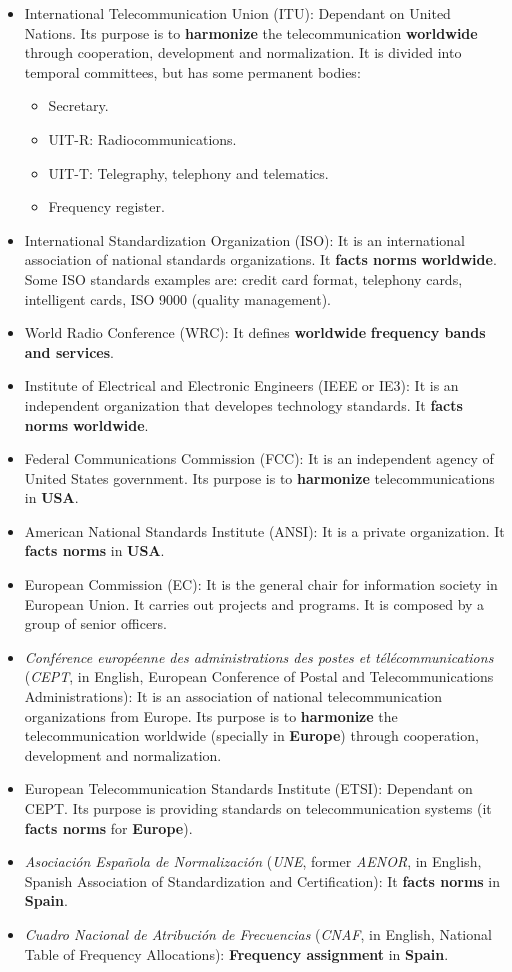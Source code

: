 \documentclass[../main.tex]{subfiles}
\begin{document}
\begin{itemize}
	\item {
		International Telecommunication Union (ITU): Dependant on United Nations. Its purpose is to \textbf{harmonize} the telecommunication \textbf{worldwide} through cooperation, development and normalization. It is divided into temporal committees, but has some permanent bodies:
		\begin{itemize}
			\item Secretary.
			\item UIT-R: Radiocommunications.
			\item UIT-T: Telegraphy, telephony and telematics.
			\item Frequency register.
		\end{itemize}
	}
	\item International Standardization Organization (ISO): It is an international association of national standards organizations. It \textbf{facts norms} \textbf{worldwide}. Some ISO standards examples are: credit card format, telephony cards, intelligent cards, ISO 9000 (quality management).
	\item World Radio Conference (WRC): It defines \textbf{worldwide} \textbf{frequency bands and services}.
	\item Institute of Electrical and Electronic Engineers (IEEE or IE3): It is an independent organization that developes technology standards. It \textbf{facts norms} \textbf{worldwide}.
	\item Federal Communications Commission (FCC): It is an independent agency of United States government. Its purpose is to \textbf{harmonize} telecommunications in \textbf{USA}.
	\item American National Standards Institute (ANSI): It is a private organization. It \textbf{facts norms} in \textbf{USA}.
	\item European Commission (EC): It is the general chair for information society in European Union. It carries out projects and programs. It is composed by a group of senior officers.
	\item \textit{Conférence européenne des administrations des postes et télécommunications} (\textit{CEPT}, in English, European Conference of Postal and Telecommunications Administrations): It is an association of national telecommunication organizations from Europe. Its purpose is to \textbf{harmonize} the telecommunication worldwide (specially in \textbf{Europe}) through cooperation, development and normalization.
	\item European Telecommunication Standards Institute (ETSI): Dependant on CEPT. Its purpose is providing standards on telecommunication systems (it \textbf{facts norms} for \textbf{Europe}).
	\item \textit{Asociación Española de Normalización} (\textit{UNE}, former \textit{AENOR}, in English, Spanish Association of Standardization and Certification): It \textbf{facts norms} in \textbf{Spain}.
	\item \textit{Cuadro Nacional de Atribución de Frecuencias} (\textit{CNAF}, in English, National Table of Frequency Allocations): \textbf{Frequency assignment} in \textbf{Spain}.
\end{itemize}
\end{document}
